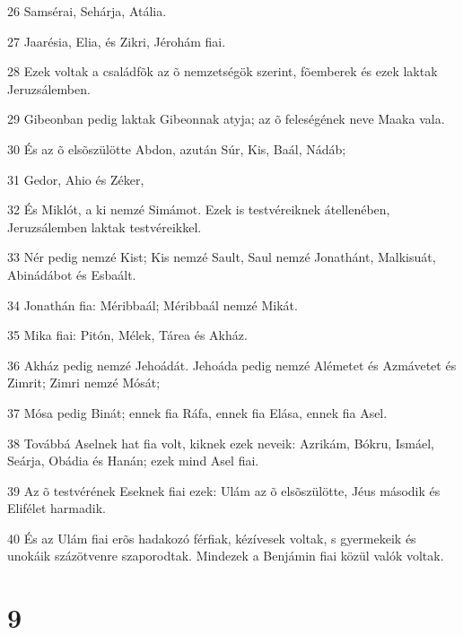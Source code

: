 \par 26 Samsérai, Sehárja, Atália.
\par 27 Jaarésia, Elia, és Zikri, Jérohám fiai.
\par 28 Ezek voltak a családfõk az õ nemzetségök szerint, fõemberek és ezek laktak Jeruzsálemben.
\par 29 Gibeonban pedig laktak Gibeonnak atyja; az õ feleségének neve Maaka vala.
\par 30 És az õ elsõszülötte Abdon, azután Súr, Kis, Baál, Nádáb;
\par 31 Gedor, Ahio és Zéker,
\par 32 És Miklót, a ki nemzé Simámot. Ezek is testvéreiknek átellenében, Jeruzsálemben laktak testvéreikkel.
\par 33 Nér pedig nemzé Kist; Kis nemzé Sault, Saul nemzé Jonathánt, Malkisuát, Abinádábot és Esbaált.
\par 34 Jonathán fia: Méribbaál; Méribbaál nemzé Mikát.
\par 35 Mika fiai: Pitón, Mélek, Tárea és Akház.
\par 36 Akház pedig nemzé Jehoádát. Jehoáda pedig nemzé Alémetet és Azmávetet és Zimrit; Zimri nemzé Mósát;
\par 37 Mósa pedig Binát; ennek fia Ráfa, ennek fia Elása, ennek fia Asel.
\par 38 Továbbá Aselnek hat fia volt, kiknek ezek neveik: Azrikám, Bókru, Ismáel, Seárja, Obádia és Hanán; ezek mind Asel fiai.
\par 39 Az õ testvérének Eseknek fiai ezek: Ulám az õ elsõszülötte, Jéus második és Elifélet harmadik.
\par 40 És az Ulám fiai erõs hadakozó férfiak, kézívesek voltak, s gyermekeik és unokáik százötvenre szaporodtak. Mindezek a Benjámin fiai közül valók voltak.

\chapter{9}

